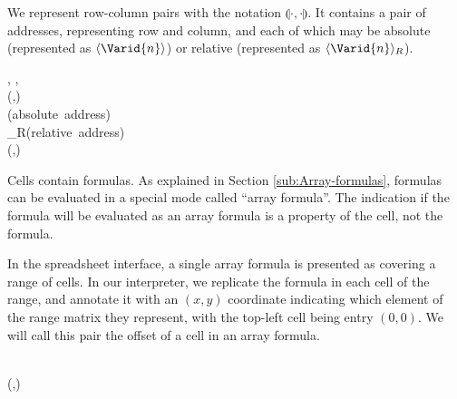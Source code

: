 We represent row-column pairs with the notation \ensuremath{\llparenthesis \cdot , \cdot \rrparenthesis }. It contains a pair
of addresses, representing row and column, and each of which may be absolute
(represented as \ensuremath{\langle \Varid{n}\rangle }) or relative (represented as \ensuremath{\langle \Varid{n}\rangle_{R}}).

\begin{hscode}\SaveRestoreHook
{}%
%
%
%
%
%
%
%
\>[B]{}\;\llparenthesis \cdot , \cdot \rrparenthesis \mathrel{=}\llparenthesis {}, \rrparenthesis {}\<[E]%
\\
\>[B]{}\<[4]%
\>[4]{}\;(,){}\<[E]%
\\[\blanklineskip]%
\>[B]{}\;\<[14]%
\>[14]{}\mathrel{=}{}\<[14E]%
\>[17]{}\langle {}\<[24]%
\>[24]{}\rangle {}\<[29]%
\>[29]{}\mbox{\onelinecomment  (absolute address)}{}\<[E]%
\\
\>[14]{}\mid {}\<[14E]%
\>[17]{}\langle {}\<[24]%
\>[24]{}\rangle_{R}{}\<[29]%
\>[29]{}\mbox{\onelinecomment  (relative address)}{}\<[E]%
\\
\>[B]{}\<[4]%
\>[4]{}\;(,){}\<[E]%
\ColumnHook
\end{hscode}\resethooks

Cells contain formulas. As explained in Section \ref{sub:Array-formulas},
formulas can be evaluated in a special mode called ``array formula''. The
indication if the formula will be evaluated as an array formula is a property
of the cell, not the formula.

In the spreadsheet interface, a single array formula is presented as covering
a range of cells. In our interpreter, we replicate the formula in each cell of
the range, and annotate it with an $(x, y)$ coordinate indicating which
element of the range matrix they represent, with the top-left cell being entry
$(0, 0)$. We will call this pair the offset of a cell in an array formula.

\begin{hscode}\SaveRestoreHook
{}%
%
%
%
%
%
%
\>[B]{}\;\<[14]%
\>[14]{}\mathrel{=}{}\<[14E]%
\>[17]{}\;{}\<[27]%
\>[27]{}\<[E]%
\\
\>[14]{}\mid {}\<[14E]%
\>[17]{}\;{}\<[27]%
\>[27]{}\;(,){}\<[E]%
\\
\>[B]{}\<[4]%
\>[4]{}\;\<[E]%
\ColumnHook
\end{hscode}\resethooks

